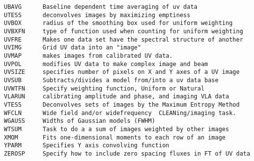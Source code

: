 \begin{verbatim}
UBAVG      Baseline dependent time averaging of uv data
UTESS      deconvolves images by maximizing emptiness
UVBOX      radius of the smoothing box used for uniform weighting
UVBXFN     type of function used when counting for uniform weighting
UVFRE      Makes one data set have the spectral structure of another
UVIMG      Grid UV data into an "image"
UVMAP      makes images from calibrated UV data.
UVPOL      modifies UV data to make complex image and beam
UVSIZE     specifies number of pixels on X and Y axes of a UV image
UVSUB      Subtracts/divides a model from/into a uv data base
UVWTFN     Specify weighting function, Uniform or Natural
VLARUN     calibrating amplitude and phase, and imaging VLA data
VTESS      Deconvolves sets of images by the Maximum Entropy Method
WFCLN      Wide field and/or widefrequency  CLEANing/imaging task.
WGAUSS     Widths of Gaussian models (FWHM)
WTSUM      Task to do a a sum of images weighted by other images
XMOM       Fits one-dimensional moments to each row of an image
YPARM      Specifies Y axis convolving function
ZEROSP     Specify how to include zero spacing fluxes in FT of UV data
\end{verbatim}\eve


